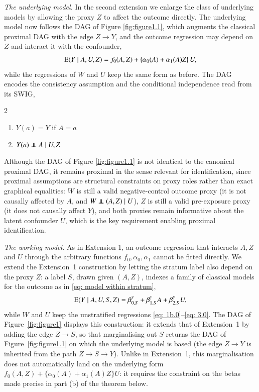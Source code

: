 \emph{The underlying model.} In the second extension we enlarge the class of underlying models by allowing the proxy $Z$ to affect the outcome directly. The underlying model now follows the DAG of Figure \ref{fig:figure1.1}, which augments the classical proximal DAG with the edge $Z \to Y$, and the outcome regression may depend on $Z$ and interact it with the confounder,
\[
\mathrm{E}(Y\mid A,U,Z)= f_0(A,Z) + \{\alpha_0(A)+\alpha_1(A)Z\}\,U,
\]
while the regressions of $W$ and $U$ keep the same form as before. The DAG encodes the consistency assumption and the conditional independence read from its SWIG,
\begin{multicols}{2}
    \begin{enumerate}
        \item $Y(a)=Y$ if $A=a$ \label{ass 1}
        \item $Y(a) \independent A \mid U,Z$ \label{ass 2}
    \end{enumerate}
\end{multicols}
\noindent Although the DAG of Figure \ref{fig:figure1.1} is not identical to the canonical proximal DAG, it remains proximal in the sense relevant for identification, since proximal assumptions are structural constraints on proxy roles rather than exact graphical equalities: $W$ is still a valid negative-control outcome proxy (it is not causally affected by $A$, and $W \independent (A,Z) \mid U$), $Z$ is still a valid pre-exposure proxy (it does not causally affect $Y$), and both proxies remain informative about the latent confounder $U$, which is the key requirement enabling proximal identification.

\emph{The working model.} As in Extension 1, an outcome regression that interacts $A,Z$ and $U$ through the arbitrary functions $f_0,\alpha_0,\alpha_1$ cannot be fitted directly. We extend the Extension~1 construction by letting the stratum label also depend on the proxy $Z$: a label $S$, drawn given $(A,Z)$, indexes a family of classical models for the outcome as in \eqref{eq: model within stratum},
\[
\mathrm{E}(Y \mid A,U,S,Z) = \beta_{0,S}^{y} + \beta_{1,S}^{y} A + \beta_{2,S}^{y} U,
\]
while $W$ and $U$ keep the unstratified regressions \eqref{eq: 1b.0}--\eqref{eq: 3.0}. The DAG of Figure~\ref{fig:figure1} displays this construction: it extends that of Extension~1 by adding the edge $Z\to S$, so that marginalising out $S$ returns the DAG of Figure~\ref{fig:figure1.1} on which the underlying model is based (the edge $Z\to Y$ is inherited from the path $Z\to S\to Y$). Unlike in Extension~1, this marginalisation does not automatically land on the underlying form $f_0(A,Z)+\{\alpha_0(A)+\alpha_1(A)Z\}U$: it requires the constraint on the betas made precise in part (b) of the theorem below.


